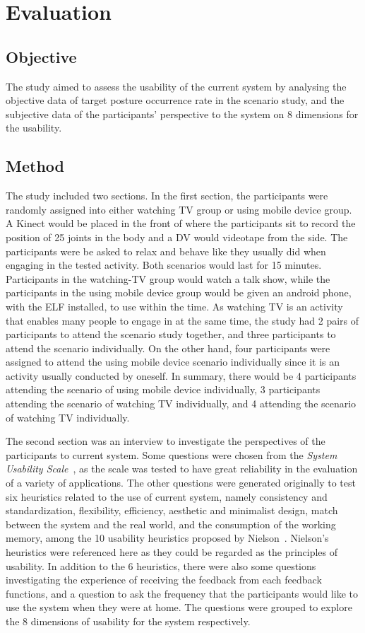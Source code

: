 \chapter{Evaluation}

\section{Objective}
The study aimed to assess the usability of the current system by analysing the objective data of target posture occurrence rate in the scenario study, and the subjective data of the participants’ perspective to the system on 8 dimensions for the usability.

\section{Method}
The study included two sections. In the first section, the participants were randomly assigned into either watching TV group or using mobile device group. A Kinect would be placed in the front of where the participants sit to record the position of 25 joints in the body and a DV would videotape from the side. The participants were be asked to relax and behave like they usually did when engaging in the tested activity. Both scenarios would last for 15 minutes. Participants in the watching-TV group would watch a talk show, while the participants in the using mobile device group would be given an android phone, with the ELF installed, to use within the time. As watching TV is an activity that enables many people to engage in at the same time, the study had 2 pairs of participants to attend the scenario study together, and three participants to attend the scenario individually. On the other hand, four participants were assigned to attend the using mobile device scenario individually since it is an activity usually conducted by oneself. In summary, there would be 4 participants attending the scenario of using mobile device individually, 3 participants attending the scenario of watching TV individually, and 4 attending the scenario of watching TV individually.

The second section was an interview to investigate the perspectives of the participants to current system. Some questions were chosen from the
\textit{System Usability Scale}~\cite{sus}, as the scale was tested to have great reliability in the evaluation of a variety of applications. The other questions were generated originally to test six heuristics related to the use of current system, namely consistency and standardization, flexibility, efficiency, aesthetic and minimalist design, match between the system and the real world, and the consumption of the working memory, among the 10 usability heuristics proposed by Nielson~\cite{nielson_heuristics}. Nielson's heuristics were referenced here as they could be regarded as the principles of usability. In addition to the 6 heuristics, there were also some questions investigating the experience of receiving the feedback from each feedback functions, and a question to ask the frequency that the participants would like to use the system when they were at home. The questions were grouped to explore the 8 dimensions of usability for the system respectively.

